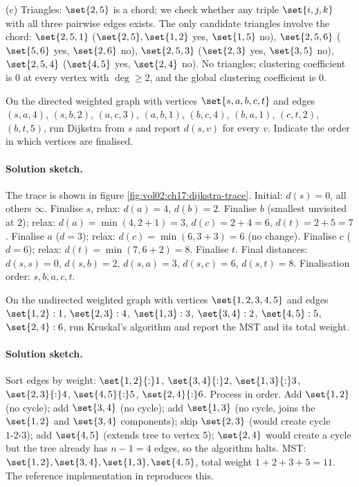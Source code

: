 (c) Triangles: $\set{2, 5}$ is a chord; we check whether any
triple $\set{i, j, k}$ with all three pairwise edges exists. The
only candidate triangles involve the chord: $\set{2, 5, 1}$
($\set{2,5}, \set{1,2}$ yes, $\set{1,5}$ no), $\set{2, 5, 6}$
($\set{5,6}$ yes, $\set{2,6}$ no), $\set{2, 5, 3}$ ($\set{2,3}$
yes, $\set{3,5}$ no), $\set{2, 5, 4}$ ($\set{4,5}$ yes, $\set{2,4}$
no). No triangles; clustering coefficient is $0$ at every vertex
with $\deg \geq 2$, and the global clustering coefficient is $0$.

\begin{exercise}
On the directed weighted graph with vertices $\set{s, a, b, c, t}$
and edges $(s, a, 4)$, $(s, b, 2)$, $(a, c, 3)$, $(a, b, 1)$, $(b,
c, 4)$, $(b, a, 1)$, $(c, t, 2)$, $(b, t, 5)$, run Dijkstra from
$s$ and report $d(s, v)$ for every $v$. Indicate the order in which
vertices are finalised.
\end{exercise}

\paragraph{Solution sketch.}
The trace is shown in figure
\ref{fig:vol02:ch17:dijkstra-trace}. Initial: $d(s) = 0$, all
others $\infty$. Finalise $s$, relax: $d(a) = 4$, $d(b) = 2$.
Finalise $b$ (smallest unvisited at $2$); relax: $d(a) =
\min(4, 2 + 1) = 3$, $d(c) = 2 + 4 = 6$, $d(t) = 2 + 5 = 7$.
Finalise $a$ ($d = 3$); relax: $d(c) = \min(6, 3 + 3) = 6$
(no change). Finalise $c$ ($d = 6$); relax: $d(t) =
\min(7, 6 + 2) = 8$. Finalise $t$. Final distances:
$d(s, s) = 0$, $d(s, b) = 2$, $d(s, a) = 3$, $d(s, c) = 6$,
$d(s, t) = 8$. Finalisation order: $s, b, a, c, t$.

\begin{exercise}
On the undirected weighted graph with vertices $\set{1, 2, 3, 4,
5}$ and edges $\set{1,2}: 1$, $\set{2,3}: 4$, $\set{1,3}: 3$,
$\set{3,4}: 2$, $\set{4,5}: 5$, $\set{2,4}: 6$, run Kruskal's
algorithm and report the MST and its total weight.
\end{exercise}

\paragraph{Solution sketch.}
Sort edges by weight: $\set{1,2}{:}1$, $\set{3,4}{:}2$,
$\set{1,3}{:}3$, $\set{2,3}{:}4$, $\set{4,5}{:}5$, $\set{2,4}{:}6$.
Process in order. Add $\set{1,2}$ (no cycle); add $\set{3,4}$ (no
cycle); add $\set{1,3}$ (no cycle, joins the $\set{1,2}$ and
$\set{3,4}$ components); skip $\set{2,3}$ (would create cycle
$1\text{-}2\text{-}3$); add $\set{4,5}$ (extends tree to vertex 5);
$\set{2,4}$ would create a cycle but the tree already has $n - 1 = 4$
edges, so the algorithm halts. MST: $\set{1,2}, \set{3,4},
\set{1,3}, \set{4,5}$, total weight $1 + 2 + 3 + 5 = 11$. The
reference implementation in
reproduces this.

